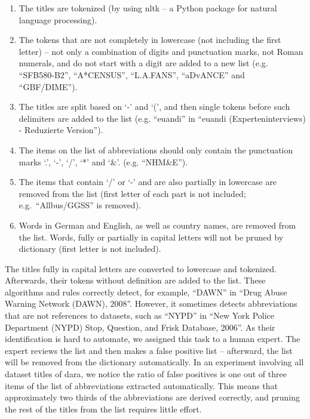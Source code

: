 \documentclass{IOS-Book-Article}
\newcommand{\dara}{\textsf{da\textbar ra}}
\begin{document}
\begin{enumerate}
	\item The titles are tokenized (by using nltk -- a Python package for natural language processing).
	\item The tokens that are not completely in lowercase (not including the first letter) -- not only a combination of digits and punctuation marks, not Roman numerals, and do not start with a digit are added to a new list (e.g. \enquote{SFB580-B2}, \enquote{A*CENSUS}, \enquote{L.A.FANS}, \enquote{aDvANCE}
	and \enquote{GBF/DIME}).
	\item The titles are split based on `-' and `(', and then single tokens before such delimiters are added to the list (e.g. \enquote{euandi} in \enquote{euandi (Experteninterviews) - Reduzierte Version}).
	\item The items on the list of abbreviations should only contain the punctuation marks `.', `-', `/', `*' and `\&'. (e.g. \enquote{NHM\&E}).
	\item The items that contain `/' or `-' and are also partially in lowercase are removed from the list (first letter of each part is not included; e.g.\ \enquote{Allbus/GGSS} is removed). 
	\item Words in German and English, as well as country names, are removed from the list. Words, fully or partially in capital letters will not be pruned by dictionary (first letter is not included).
\end{enumerate}
The titles fully in capital letters are converted to lowercase and tokenized.
Afterwards, their tokens without definition are added to the list.
These algorithms and rules correctly detect, for example, \enquote{DAWN} in \enquote{Drug Abuse Warning Network (DAWN), 2008}.
However, it sometimes detects abbreviations that are not references to datasets, such as \enquote{NYPD} in \enquote{New York Police Department (NYPD) Stop, Question, and Frisk Database, 2006}.
As their identification is hard to automate, we assigned this task to a human expert. 
The expert reviews the list and then makes a false positive list -- afterward, the list will be removed from the dictionary automatically.
In an experiment involving all dataset titles of {\dara}, we notice the ratio of false positives is one out of three items of the list of abbreviations extracted automatically.
This means that approximately two thirds of the abbreviations are derived correctly, and pruning the rest of the titles from the list requires little effort.
\end{document}
